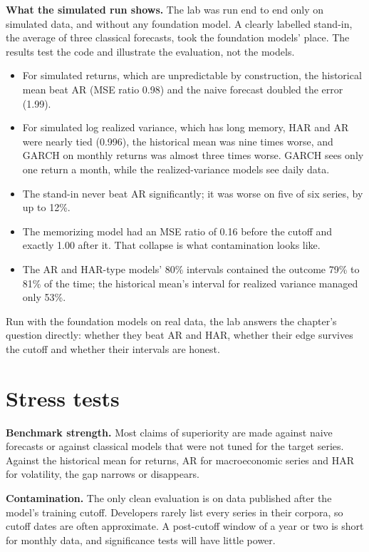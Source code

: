 \textbf{What the simulated run shows.} The lab was run end to end only on simulated data, and without any foundation model. A clearly labelled stand-in, the average of three classical forecasts, took the foundation models' place. The results test the code and illustrate the evaluation, not the models.

\begin{itemize}
  \item For simulated returns, which are unpredictable by construction, the historical mean beat AR (MSE ratio 0.98) and the naive forecast doubled the error (1.99).
  \item For simulated log realized variance, which has long memory, HAR and AR were nearly tied (0.996), the historical mean was nine times worse, and GARCH on monthly returns was almost three times worse. GARCH sees only one return a month, while the realized-variance models see daily data.
  \item The stand-in never beat AR significantly; it was worse on five of six series, by up to 12\%.
  \item The memorizing model had an MSE ratio of 0.16 before the cutoff and exactly 1.00 after it. That collapse is what contamination looks like.
  \item The AR and HAR-type models' 80\% intervals contained the outcome 79\% to 81\% of the time; the historical mean's interval for realized variance managed only 53\%.
\end{itemize}

Run with the foundation models on real data, the lab answers the chapter's question directly: whether they beat AR and HAR, whether their edge survives the cutoff and whether their intervals are honest.

\section{Stress tests}
\label{sec:21-stress}

\textbf{Benchmark strength.} Most claims of superiority are made against naive forecasts or against classical models that were not tuned for the target series. Against the historical mean for returns, AR for macroeconomic series and HAR for volatility, the gap narrows or disappears.

\textbf{Contamination.} The only clean evaluation is on data published after the model's training cutoff. Developers rarely list every series in their corpora, so cutoff dates are often approximate. A post-cutoff window of a year or two is short for monthly data, and significance tests will have little power.


